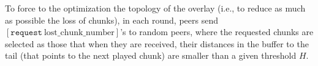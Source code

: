 To force to the optimization the topology of the overlay (i.e., to
reduce as much as possible the loss of chunks), in each round, peers
send $[\mathtt{request}~\text{lost\_chunk\_number}]$'s to random peers,
where the requested chunks are selected as those that when they are
received, their distances in the buffer to the tail (that points to the
next played chunk) are smaller than a given threshold $H$.

\begin{comment}
origin peer of the next chunk stored in the
buffer. This peer has to characteristics: (1) it is not necessary a
neighbor peer, and (2) there is a high probability that this chunk has
been stored in the buffer ``for a long time'', so, if it is not a
neighbor, the link between it and the peer is working fairly well.
\end{comment}

  
